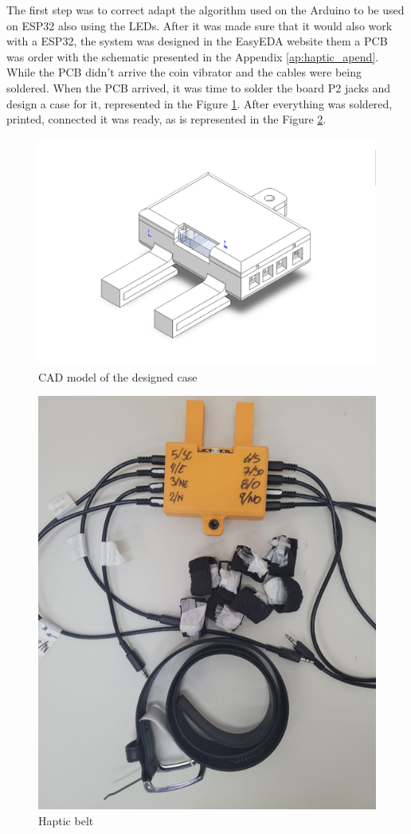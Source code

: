  The first step was to correct adapt the algorithm used on the Arduino to be used on ESP32 also using the LEDs. After it was made sure that it would also work with a ESP32, the system was designed in the EasyEDA website \cite{easyeda} them a PCB was order with the schematic presented in the Appendix \ref{ap:haptic_apend}. While the PCB didn't arrive the coin vibrator and the cables were being soldered. When the PCB arrived, it was time to solder the board P2 jacks and design a case for it, represented in the Figure \ref{fig:case_cinto}. After everything was soldered, printed, connected it was ready, as is represented in the Figure \ref{fig:cinto_haptico}.
 
 \begin{figure}[!htb]
     \centering
     \includegraphics[width = 0.8\linewidth]{Cinto/Case Cinto.png}
     \caption{CAD model of the designed case}
     \label{fig:case_cinto}
 \end{figure}
 \begin{figure}[!htb]
     \centering
     \includegraphics[width = 0.8\linewidth]{Cinto/Cinto Haptico.png}
     \caption{Haptic belt}
     \label{fig:cinto_haptico}
 \end{figure}
 
